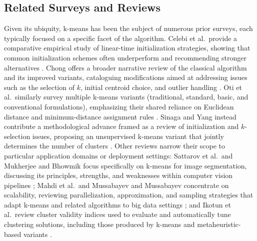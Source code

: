 \subsection{Related Surveys and Reviews}
Given its ubiquity, k-means has been the subject of numerous prior surveys, each typically focused on a specific facet of the algorithm. Celebi et al.\ provide a comparative empirical study of linear-time initialization strategies, showing that common initialization schemes often underperform and recommending stronger alternatives \cite{celebi2012comparative}. Chong offers a broader narrative review of the classical algorithm and its improved variants, cataloguing modifications aimed at addressing issues such as the selection of $k$, initial centroid choice, and outlier handling \cite{chong2021means}. Oti et al.\ similarly survey multiple k-means variants (traditional, standard, basic, and conventional formulations), emphasizing their shared reliance on Euclidean distance and minimum-distance assignment rules \cite{oti2021comprehensive}. Sinaga and Yang instead contribute a methodological advance framed as a review of initialization and $k$-selection issues, proposing an unsupervised k-means variant that jointly determines the number of clusters \cite{sinaga2020unsupervised}. Other reviews narrow their scope to particular application domains or deployment settings: Sattarov et al.\ and Mukherjee and Bhowmik focus specifically on k-means for image segmentation, discussing its principles, strengths, and weaknesses within computer vision pipelines \cite{sattarov2023unveiling,mukherjee2025survey}; Mahdi et al.\ and Mussabayev and Mussabayev concentrate on scalability, reviewing parallelization, approximation, and sampling strategies that adapt k-means and related algorithms to big data settings \cite{mahdi2021scalable,mussabayev2023comparative}; and Ikotun et al.\ review cluster validity indices used to evaluate and automatically tune clustering solutions, including those produced by k-means and metaheuristic-based variants \cite{ikotun2025cluster}.

